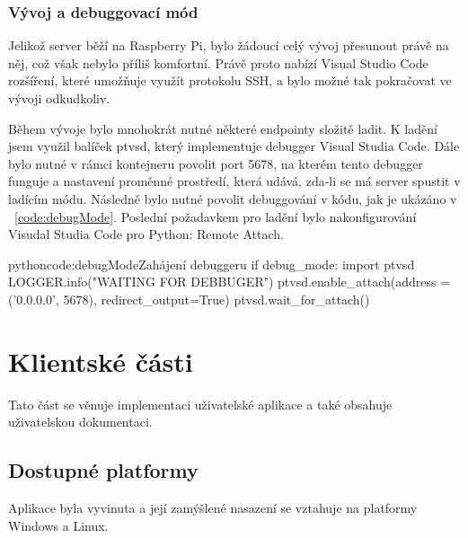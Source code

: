 \documentclass[
  glossaries,
]{kidiplom}
\begin{document}
\subsubsection{Vývoj a debuggovací mód}
Jelikož server běží na Raspberry Pi, bylo žádoucí celý vývoj přesunout právě na něj, což však nebylo příliš komfortní. Právě proto nabízí Visual Studio Code rozšíření, které umožňuje využít protokolu SSH, a bylo možné tak pokračovat ve vývoji odkudkoliv.

Během vývoje bylo mnohokrát nutné některé endpointy složitě ladit. K ladění jsem využil balíček ptvsd, který implementuje debugger Visual Studia Code. Dále bylo nutné v rámci kontejneru povolit port 5678, na kterém tento debugger funguje a nastavení proměnné prostředí, která udává, zda-li se má server spustit v ladícím módu. Následně bylo nutné povolit debuggování v kódu, jak je ukázáno v ~\ref{code:debugMode}. Poslední požadavkem pro ladění bylo nakonfigurování Visudal Studia Code pro Python: Remote Attach. 
\begin{kicode}{python}{code:debugMode}{Zahájení debuggeru}
    if debug_mode:
        import ptvsd
        LOGGER.info("WAITING FOR DEBBUGER")
        ptvsd.enable_attach(address = ('0.0.0.0', 5678), redirect_output=True)
        ptvsd.wait_for_attach()
\end{kicode}
\clearpage
\section{Klientské části}
Tato část se věnuje implementaci uživatelské aplikace a také obsahuje uživatelskou dokumentaci.

\subsection{Dostupné platformy}
Aplikace byla vyvinuta a její zamýšlené nasazení se vztahuje na platformy Windows a Linux.
\end{document}
